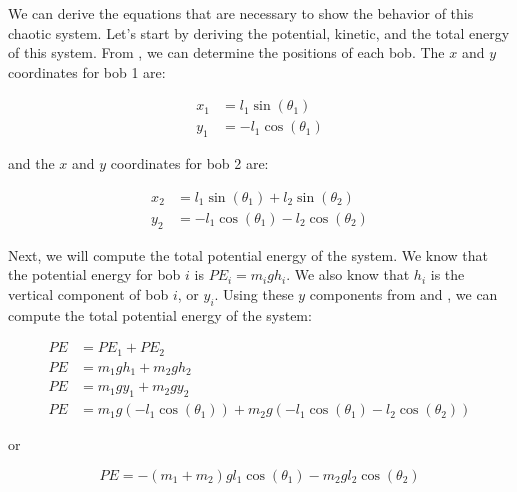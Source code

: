 We can derive the equations that are necessary to show the behavior of this chaotic system. Let's start by deriving the potential, kinetic, and the total energy of this system. From , we can determine the positions of each bob. The $x$ and $y$ coordinates for bob 1 are:

\begin{equation}
    \begin{aligned}
        x_1 &= l_1\sin\left(\theta_1\right)\\
        y_1 &= -l_1\cos\left(\theta_1\right)
    \end{aligned}
    \label{eq:bob-1-position-components}
\end{equation}

and the $x$ and $y$ coordinates for bob 2 are:

\begin{equation}
    \begin{aligned}
        x_2 &= l_1\sin\left(\theta_1\right) + l_2\sin\left(\theta_2\right)\\
        y_2 &= -l_1\cos\left(\theta_1\right) - l_2\cos\left(\theta_2\right)
    \end{aligned}
    \label{eq:bob-2-position-components}
\end{equation}

Next, we will compute the total potential energy of the system. We know that the potential energy for bob $i$ is $PE_i = m_i g h_i$. We also know that $h_i$ is the vertical component of bob $i$, or $y_i$. Using these $y$ components from  and , we can compute the total potential energy of the system:

\begin{align*}
    PE &= PE_1 + PE_2\\
    PE &= m_1gh_1 + m_2gh_2\\
    PE &= m_1gy_1 + m_2gy_2\\
    PE &= m_1g\left(-l_1\cos\left(\theta_1\right)\right) + m_2g\left(-l_1\cos\left(\theta_1\right) - l_2\cos\left(\theta_2\right)\right)
\end{align*}

or 

\begin{equation}
    PE = -\left(m_1 + m_2\right)gl_1\cos\left(\theta_1\right) - m_2gl_2\cos\left(\theta_2\right)
    \label{eq:potential-energy}
\end{equation}

